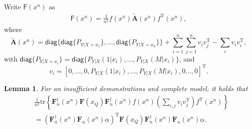 \documentclass{article} %
\theoremstyle{plain} %
\newtheorem{lemma}[theorem]{Lemma}          %
\begin{document}
Write $\mathsf{F}(x^n)$ as
\begin{align*}
    \mathsf{F}(x^n) = \frac1{n^2}f(x^n) \tilde{\mathbf{A}}(x^n)f^\mathrm{T}(x^n),
\end{align*}
where
\begin{equation*}
    \tilde{\mathbf{A}}(x^n) = \textsf{diag}\{\textsf{diag}\{P_{Y|X=x_1}\},\dots,\textsf{diag}\{P_{Y|X=x_n}\} \} + \sum_{i=1}^n\sum_{j=1}^n v_iv_j^\mathrm{T} - \sum_i v_iv_i^\mathrm{T},
\end{equation*}
with $\textsf{diag}\{P_{Y|X=x_i}\} = \textsf{diag}\{P_{Y|X}(1|x_i),\dots,P_{Y|X}(M|x_i)\}$, and
\begin{equation*}
    v_i = \left[0,\dots,0,P_{Y|X}(1|x_i),\dots, P_{Y|X}(M|x_i),0\dots,0\right]^\mathrm{T}.
\end{equation*}

\begin{lemma}\label{lem:aFa_comple_insufficient}
For an insufficient demonstrations and complete model, it holds that
\begin{align*}
& \frac1{n^2}\mathrm{tr}\left\{ \mathbf{F}_n^{\dagger}(x^n)\mathbf{F}(x_Q)\mathbf{F}_n^{\dagger}(x^n) f(x^n)\left(\sum_{i,j}v_iv_j^\mathrm{T}\right) f^\mathrm{T}(x^n)\right\}\\
& = \left(\mathbf{F}_n^{\dagger}(x^n)\mathbf{F}_n(x^n)\underline{\alpha}\right)^\mathrm{T}\mathbf{F}(x_Q) \mathbf{F}_n^{\dagger}(x^n)\mathbf{F}_n(x^n)\underline{\alpha}.
\end{align*}
\end{lemma}
\end{document}
